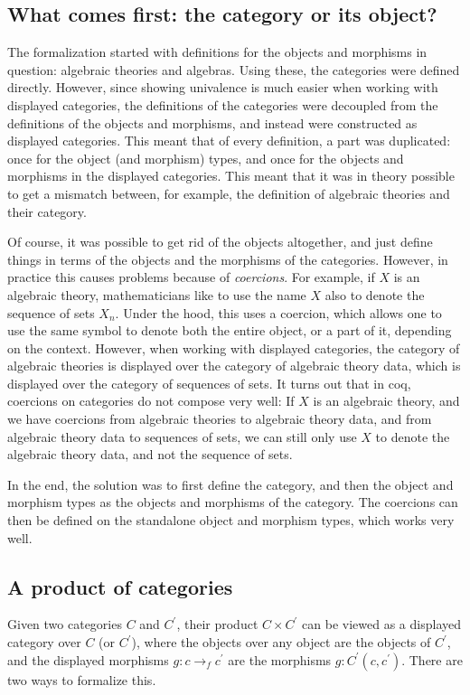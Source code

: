 \subsection{What comes first: the category or its object?}
The formalization started with definitions for the objects and morphisms in question: algebraic theories and algebras. Using these, the categories were defined directly. However, since showing univalence is much easier when working with displayed categories, the definitions of the categories were decoupled from the definitions of the objects and morphisms, and instead were constructed as displayed categories. This meant that of every definition, a part was duplicated: once for the object (and morphism) types, and once for the objects and morphisms in the displayed categories. This meant that it was in theory possible to get a mismatch between, for example, the definition of algebraic theories and their category.

Of course, it was possible to get rid of the objects altogether, and just define things in terms of the objects and the morphisms of the categories. However, in practice this causes problems because of \textit{coercions}. For example, if $ X $ is an algebraic theory, mathematicians like to use the name $ X $ also to denote the sequence of sets $ X_n $. Under the hood, this uses a coercion, which allows one to use the same symbol to denote both the entire object, or a part of it, depending on the context. However, when working with displayed categories, the category of algebraic theories is displayed over the category of algebraic theory data, which is displayed over the category of sequences of sets. It turns out that in coq, coercions on categories do not compose very well: If $ X $ is an algebraic theory, and we have coercions from algebraic theories to algebraic theory data, and from algebraic theory data to sequences of sets, we can still only use $ X $ to denote the algebraic theory data, and not the sequence of sets.

In the end, the solution was to first define the category, and then the object and morphism types as the objects and morphisms of the category. The coercions can then be defined on the standalone object and morphism types, which works very well.

\subsection{A product of categories}\label{subsec:displayed-product}
Given two categories $ C $ and $ C^\prime $, their product $ C \times C^\prime $ can be viewed as a displayed category over $ C $ (or $ C^\prime $), where the objects over any object are the objects of $ C^\prime $, and the displayed morphisms $ g: c \to_f c^\prime $ are the morphisms $ g: C^\prime(c, c^\prime) $. There are two ways to formalize this.

